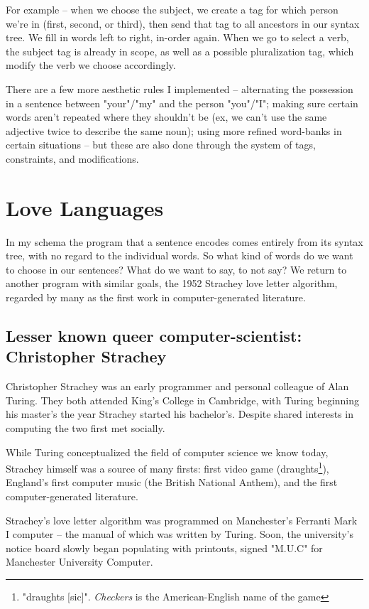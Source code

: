 \documentclass[runningheads]{llncs}
\begin{document}
For example -- when we choose the subject, we create a tag for which person we're in (first, second, or third), then send that tag to all ancestors in our syntax tree. We fill in words left to right, in-order again. When we go to select a verb, the subject tag is already in scope, as well as a possible pluralization tag, which modify the verb we choose accordingly.

There are a few more aesthetic rules I implemented -- alternating the possession in a sentence between "your"/"my" and the person "you"/"I"; making sure certain words aren't repeated where they shouldn't be (ex, we can't use the same adjective twice to describe the same noun); using more refined word-banks in certain situations -- but these are also done through the system of tags, constraints, and modifications.
\section{Love Languages}
In my schema the program that a sentence encodes comes entirely from its syntax tree, with no regard to the individual words. So what kind of words do we want to choose in our sentences? What do we want to say, to not say? We return to another program with similar goals, the 1952 Strachey love letter algorithm, regarded by many as the first work in computer-generated literature. \cite{gaboury2013}

\subsection{Lesser known queer computer-scientist: Christopher Strachey}
Christopher Strachey was an early programmer and personal colleague of Alan Turing. They both attended King's College in Cambridge, with Turing beginning his master's the year Strachey started his bachelor's. Despite shared interests in computing the two first met socially.

While Turing conceptualized the field of computer science we know today, Strachey himself was a source of many firsts: first video game (draughts\footnote{"draughts [sic]". \textit{Checkers} is the American-English name of the game}), England's first computer music (the British National Anthem), and the first computer-generated literature.

Strachey's love letter algorithm was programmed on Manchester's Ferranti Mark I computer -- the manual of which was written by Turing. Soon, the university's notice board slowly began populating with printouts, signed "M.U.C" for Manchester University Computer.
\end{document}
